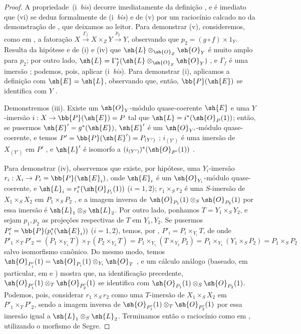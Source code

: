 \documentclass[oneside,10pt]{amsart}
\makeatletter
\newcommand{\ega@arrow}[2]{\mathchoice{#1}{#2}{#2}{#2}}
\renewcommand{\to}{\ega@arrow{\longrightarrow}{\rightarrow}}
\newcommand{\oldpage}[2][]{\marginnote{\normalfont\footnotesize\textbf{#1}~|~#2}\ignorespaces}
\makeatother
\begin{document}
\begin{proof}
A propriedade~(i~\emph{bis}) decorre imediatamente da definição , e é imediato que (vi) se deduz formalmente de (i~\emph{bis}) e de (v) por um raciocínio calcado no da demonstração de , que deixamos ao leitor.
Para demonstrar (v), consideremos, como em , a fatoração $X\xrightarrow{\Gamma_f}X\times_Z Y\xrightarrow{p_2}Y$, observando que $p_2=(g\circ f)\times1_Y$.
Resulta da hipótese e de (i) e (iv) que $\sh{L}\otimes_{\sh{O}_Z}\sh{O}_Y$ é muito amplo para $p_2$;
por outro lado, $\sh{L}=\Gamma_f^*(\sh{L}\otimes_{\sh{O}_Z}\sh{O}_Y)$ , e $\Gamma_f$ é uma imersão ;
podemos, pois, aplicar (i~\emph{bis}).
\oldpage[II]{82}
Para demonstrar (i), aplicamos a definição  com $\sh{E}=\sh{L}$, observando que, então, $\bb{P}(\sh{E})$ se identifica com $Y$ .

Demonstremos (iii).
Existe um $\sh{O}_Y$-módulo quase-coerente $\sh{E}$ e uma $Y$-imersão $i:X\to\bb{P}(\sh{E})=P$ tal que $\sh{L}=i^*(\sh{O}_P(1))$;
então, se pusermos $\sh{E}'=g^*(\sh{E})$, $\sh{E}'$ é um $\sh{O}_{Y'}$-módulo quase-coerente, e temos $P'=\bb{P}(\sh{E}')=P_{(Y')}$ ; $i_{(Y')}$ é uma imersão de $X_{(Y')}$ em $P'$ , e $\sh{L}'$ é isomorfo a $(i_{(Y')})^*(\sh{O}_{P'}(1))$ .

Para demonstrar (iv), observemos que existe, por hipótese, uma $Y_i$-imersão $r_i:X_i\to P_i=\bb{P}(\sh{E}_i)$, onde $\sh{E}_i$ é um $\sh{O}_{Y_i}$-módulo quase-coerente, e $\sh{L}_i=r_i^*(\sh{O}_{P_i}(1))$ ($i=1,2$);
$r_1\times_S r_2$ é uma $S$-imersão de $X_1\times_S X_2$ em $P_1\times_S P_2$ , e a imagem inversa de $\sh{O}_{P_1}(1)\otimes_S\sh{O}_{P_2}(1)$ por essa imersão é $\sh{L}_1\otimes_S\sh{L}_2$.
Por outro lado, ponhamos $T=Y_1\times_S Y_2$, e sejam $p_1,p_2$ as projeções respectivas de $T$ em $Y_1,Y_2$.
Se pusermos $P'_i=\bb{P}(p_i^*(\sh{E}_i))$ ($i=1,2$), temos, por , $P'_i=P_i\times_{Y_i}T$, de onde
\[
  P'_1\times_T P'_2
  =(P_1\times_{Y_1}T)\times_T(P_2\times_{Y_2}T)
  =P_1\times_{Y_1}(T\times_{Y_2}P_2)
  =P_1\times_{Y_1}(Y_1\times_S P_2)
  =P_1\times_S P_2
\]
salvo isomorfismo canônico.
Do mesmo modo, temos $\sh{O}_{P'_i}(1)=\sh{O}_{P_i}(1)\otimes_{Y_i}\sh{O}_T$ , e um cálculo análogo (baseado, em particular, em  e ) mostra que, na identificação precedente, $\sh{O}_{P'_1}(1)\otimes_T\sh{O}_{P'_2}(1)$ se identifica com $\sh{O}_{P_1}(1)\otimes_S\sh{O}_{P_2}(1)$.
Podemos, pois, considerar $r_1\times_S r_2$ como uma $T$-imersão de $X_1\times_S X_2$ em $P'_1\times_T P'_2$, sendo a imagem inversa de $\sh{O}_{P'_1}(1)\otimes_T\sh{O}_{P'_2}(1)$ por essa imersão igual a $\sh{L}_1\otimes_S\sh{L}_2$.
Terminamos então o raciocínio como em , utilizando o morfismo de Segre.


\end{proof}
\end{document}
